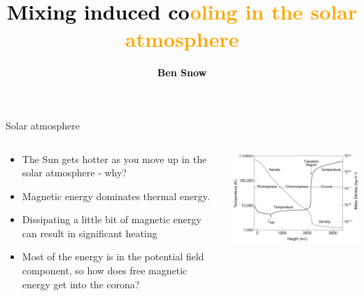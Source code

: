 \documentclass[10pt,aspectratio=169,usenames,dvipsnames]{beamer}
\title{\textcolor{black}{Mixing induced co}\textcolor{orange}{oling in the solar atmosphere}}
\date{}
\author{\textbf{\textcolor{black}{Ben Snow}}}
\institute{\textcolor{black}{University of Exeter} \\ \textcolor{black}{UKMHD2023, Leeds, 19th May 2023.}}
\begin{document}
\maketitle

\begin{frame}{Solar atmosphere}
\begin{columns}
\begin{column}{0.5\textwidth}
\begin{itemize}
    \item The Sun gets hotter as you move up in the solar atmosphere - why?
    \item Magnetic energy dominates thermal energy.
    \item Dissipating a little bit of magnetic energy can result in significant heating
    \item Most of the energy is in the potential field component, so how does free magnetic energy get into the corona?
\end{itemize}
\end{column}
\begin{column}{0.5\textwidth}
\includegraphics[width=0.95\linewidth]{2023Dundee/Figures/valc.png} \\
\end{column}
\end{columns}
\end{frame}
\end{document}

